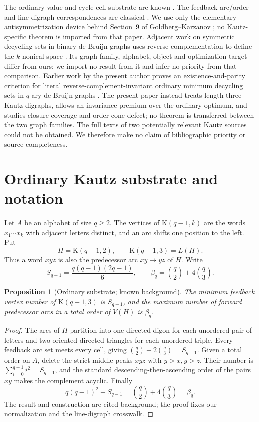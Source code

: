 \documentclass[11pt,a4paper]{article}
\newtheorem{proposition}[theorem]{Proposition}
\theoremstyle{remark}
\newcommand{\Kautz}{\mathrm K}
\begin{document}
The ordinary value and cycle-cell substrate are known
\cite{XuWuHuangYang2007,XuYinZhangHuang2014}.  The feedback-arc/order and
line-digraph correspondences are classical
\cite{Younger1963,CheungKuh1974}.  We use only the elementary
antisymmetrization device behind Section~9 of Goldberg--Karzanov
\cite{GoldbergKarzanov2004}; no Kautz-specific theorem is imported from that
paper.  Adjacent work on symmetric decycling sets in binary de Bruijn graphs
uses reverse complementation to define the \(k\)-nonical space
\cite{MarcaisElderKingsford2024}.  Its graph family, alphabet, object and
optimization target differ from ours; we import no result from it and infer no
priority from that comparison.  Earlier work by the present author proves an
existence-and-parity criterion for literal reverse-complement-invariant
ordinary minimum decycling sets in \(q\)-ary de Bruijn graphs
\cite{Babanskyy2026Parity}.  The present paper instead treats length-three
Kautz digraphs, allows an invariance premium over the ordinary optimum, and
studies closure coverage and order-cone defect; no theorem is transferred
between the two graph families.  The full texts of two potentially relevant
Kautz sources
\cite{Yin2015Thesis,ZhangXuYangYin2016} could not be obtained.  We therefore
make no claim of bibliographic priority or source completeness.

\section{Ordinary Kautz substrate and notation}
\label{sec:ordinary}

Let \(A\) be an alphabet of size \(q\geq2\).  The vertices of
\(\Kautz(q-1,k)\) are the words \(x_1\cdots x_k\) with adjacent letters
distinct, and an arc shifts one position to the left.  Put
\[
 H=\Kautz(q-1,2),\qquad \Kautz(q-1,3)=L(H).
\]
Thus a word \(xyz\) is also the predecessor arc \(xy\to yz\) of \(H\).
Write
\[
 S_{q-1}=\frac{q(q-1)(2q-1)}6,
 \qquad
 \beta_q=\binom q2+4\binom q3.
\]

\begin{proposition}[Ordinary substrate; known background]
\label{prop:ordinary-substrate}
The minimum feedback vertex number of \(\Kautz(q-1,3)\) is \(S_{q-1}\),
and the maximum number of forward predecessor arcs in a total order of
\(V(H)\) is \(\beta_q\).
\end{proposition}

\begin{proof}
The arcs of \(H\) partition into one directed digon for each unordered pair
of letters and two oriented directed triangles for each unordered triple.
Every feedback arc set meets every cell, giving
\(\binom q2+2\binom q3=S_{q-1}\).  Given a total order on \(A\), delete the
strict middle peaks \(xyz\) with \(y>x,y>z\).  Their number is
\(\sum_{i=0}^{q-1}i^2=S_{q-1}\), and the standard descending-then-ascending
order of the pairs \(xy\) makes the complement acyclic.  Finally
\[
 q(q-1)^2-S_{q-1}=\binom q2+4\binom q3=\beta_q.
\]
The result and construction are cited background; the proof fixes our
normalization and the line-digraph crosswalk.
\end{proof}
\end{document}
